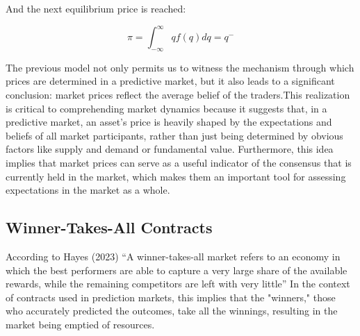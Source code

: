 And the next equilibrium price is reached:

\begin{equation}
    \pi = \int_{-\infty}^{\infty} q f(q) dq = q^-
\end{equation}

The previous model not only permits us to witness the mechanism through which prices are determined in a predictive market, but it also leads to a significant conclusion: market prices reflect the average belief of the traders.This realization is critical to comprehending market dynamics because it suggests that, in a predictive market, an asset's price is heavily shaped by the expectations and beliefs of all market participants, rather than just being determined by obvious factors like supply and demand or fundamental value. Furthermore, this idea implies that market prices can serve as a useful indicator of the consensus that is currently held in the market, which makes them an important tool for assessing expectations in the market as a whole. 

\subsection{Winner-Takes-All Contracts}
\label{subsec:winner_takes_all_contracts}

According to Hayes (2023) “A winner-takes-all market refers to an economy in which the best performers are able to capture a very large share of the available rewards, while the remaining competitors are left with very little” In the context of contracts used in prediction markets, this implies that the "winners," those who accurately predicted the outcomes, take all the winnings, resulting in the market being emptied of resources.


